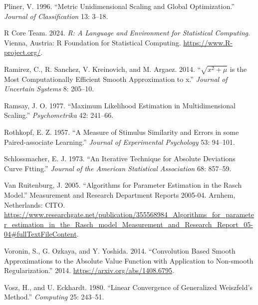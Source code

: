 \documentclass[
  12pt,
  letterpaper,
  DIV=11,
  numbers=noendperiod]{scrartcl}
\newlength{\cslhangindent}
\newenvironment{CSLReferences}[2] %
 {\begin{list}{}{%
  \setlength{\itemindent}{0pt}
  \setlength{\leftmargin}{0pt}
  \setlength{\parsep}{0pt}
  \ifodd #1
   \setlength{\leftmargin}{\cslhangindent}
   \setlength{\itemindent}{-1\cslhangindent}
  \fi
  \setlength{\itemsep}{#2\baselineskip}}}
 {\end{list}}
\theoremstyle{plain}
\theoremstyle{plain}
\theoremstyle{plain}
\theoremstyle{definition}
\theoremstyle{remark}
\begin{document}
\begin{CSLReferences}{1}{0}
Pliner, V. 1996. {``{Metric Unidimensional Scaling and Global
Optimization}.''} \emph{Journal of Classification} 13: 3--18.

R Core Team. 2024. \emph{R: A Language and Environment for Statistical
Computing}. {Vienna, Austria}: R Foundation for Statistical Computing.
\url{https://www.R-project.org/}.

Ramirez, C., R. Sanchez, V. Kreinovich, and M. Argaez. 2014.
{``{\(\sqrt{x^2+\mu}\) is the Most Computationally Efficient Smooth
Approximation to \vert{}x\vert{}}.''} \emph{Journal of Uncertain
Systems} 8: 205--10.

Ramsay, J. O. 1977. {``{Maximum Likelihood Estimation in
Multidimensional Scaling}.''} \emph{Psychometrika} 42: 241--66.

Rothkopf, E. Z. 1957. {``{A Measure of Stimulus Similarity and Errors in
some Paired-associate Learning}.''} \emph{Journal of Experimental
Psychology} 53: 94--101.

Schlossmacher, E. J. 1973. {``An Iterative Technique for Absolute
Deviations Curve Ftting.''} \emph{Journal of the American Statistical
Association} 68: 857--59.

Van Ruitenburg, J. 2005. {``{Algorithms for Parameter Estimation in the
Rasch Model}.''} Measurement and Research Department Reports 2005-04.
Arnhem, Netherlands: CITO.
\url{https://www.researchgate.net/publication/355568984_Algorithms_for_parameter_estimation_in_the_Rasch_model_Measurement_and_Research_Report_05-04\#fullTextFileContent}.

Voronin, S., G. Ozkaya, and Y. Yoshida. 2014. {``{Convolution Based
Smooth Approximations to the Absolute Value Function with Application to
Non-smooth Regularization}.''} 2014.
\url{https://arxiv.org/abs/1408.6795}.

Vosz, H., and U. Eckhardt. 1980. {``{Linear Convergence of Generalized
{W}eiszfeld's Method}.''} \emph{Computing} 25: 243--51.

\end{CSLReferences}
\end{document}
